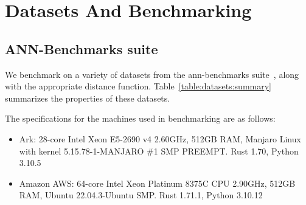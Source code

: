 
\section{Datasets And Benchmarking}
\label{sec:datasets-and-distance-functions}



\subsection{ANN-Benchmarks suite}
\label{subsec:datasets:ann-benchmarks-suite}

We benchmark on a variety of datasets from the ann-benchmarks suite~\cite{Aumller2018ANNBenchmarksAB}, 
along with the appropriate distance function.
Table~\ref{table:datasets:summary} summarizes the properties of these datasets.

The specifications for the machines used in benchmarking are as follows:

\begin{itemize}
\item Ark: 28-core Intel Xeon E5-2690 v4 2.60GHz, 512GB RAM, Manjaro Linux with kernel 5.15.78-1-MANJARO \#1 SMP PREEMPT. Rust 1.70, Python 3.10.5
\item Amazon AWS: 64-core Intel Xeon Platinum 8375C CPU 2.90GHz, 512GB RAM, Ubuntu 22.04.3-Ubuntu SMP. Rust 1.71.1, Python 3.10.12
\end{itemize}




